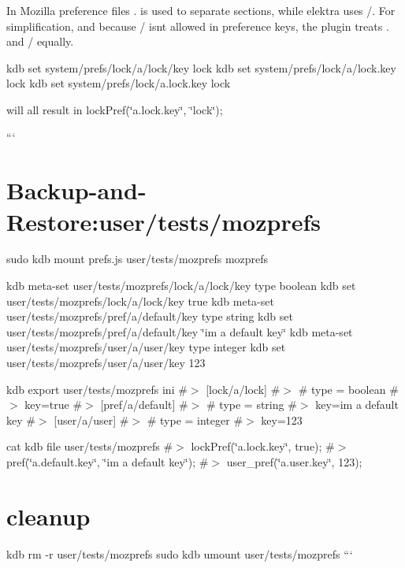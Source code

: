 In Mozilla preference files {\ttfamily .} is used to separate sections, while elektra uses {\ttfamily /}. For simplification, and because {\ttfamily /} isn\textquotesingle{}t allowed in preference keys, the plugin treats {\ttfamily .} and {\ttfamily /} equally.


\begin{DoxyCode}
kdb set system/prefs/lock/a/lock/key lock
kdb set system/prefs/lock/a/lock.key lock
kdb set system/prefs/lock/a.lock.key lock
\end{DoxyCode}


will all result in {\ttfamily lock\+Pref(\char`\"{}a.\+lock.\+key\char`\"{}, \char`\"{}lock\char`\"{});}

``` \hypertarget{autotoc_md474_autotoc_md479}{}\section{Backup-\/and-\/\+Restore\+:user/tests/mozprefs}\label{autotoc_md474_autotoc_md479}
sudo kdb mount prefs.\+js user/tests/mozprefs mozprefs

kdb meta-\/set user/tests/mozprefs/lock/a/lock/key type boolean kdb set user/tests/mozprefs/lock/a/lock/key true kdb meta-\/set user/tests/mozprefs/pref/a/default/key type string kdb set user/tests/mozprefs/pref/a/default/key \char`\"{}i\textquotesingle{}m a default key\char`\"{} kdb meta-\/set user/tests/mozprefs/user/a/user/key type integer kdb set user/tests/mozprefs/user/a/user/key 123

kdb export user/tests/mozprefs ini \#$>$ \mbox{[}lock/a/lock\mbox{]} \#$>$ \# type = boolean \#$>$ key=true \#$>$ \mbox{[}pref/a/default\mbox{]} \#$>$ \# type = string \#$>$ key=i\textquotesingle{}m a default key \#$>$ \mbox{[}user/a/user\mbox{]} \#$>$ \# type = integer \#$>$ key=123

cat {\ttfamily kdb file user/tests/mozprefs} \#$>$ lock\+Pref(\char`\"{}a.\+lock.\+key\char`\"{}, true); \#$>$ pref(\char`\"{}a.\+default.\+key\char`\"{}, \char`\"{}i\textquotesingle{}m a default key\char`\"{}); \#$>$ user\+\_\+pref(\char`\"{}a.\+user.\+key\char`\"{}, 123);\hypertarget{autotoc_md474_autotoc_md480}{}\section{cleanup}\label{autotoc_md474_autotoc_md480}
kdb rm -\/r user/tests/mozprefs sudo kdb umount user/tests/mozprefs ``` 
